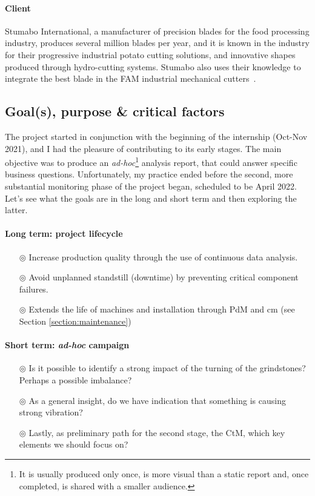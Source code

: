 \paragraph{Client} Stumabo International, a manufacturer of precision blades for the food processing industry, produces several million blades per year, 
and it is known in the industry for their progressive industrial potato cutting solutions, and innovative shapes produced through hydro-cutting systems.
Stumabo also uses their knowledge to integrate the best blade in the FAM industrial mechanical cutters~\cite{Misc:stumabo_en_website}.

\subsection{Goal(s), purpose \& critical factors}
The project started in conjunction with the beginning of the internship (Oct-Nov 2021), and I had the pleasure of contributing to its early stages.
The main objective was to produce an \textit{ad-hoc}\footnote{It is usually produced only once, is more visual than a static report and, once completed, is shared with a smaller audience.} 
analysis report, that could answer specific business questions.
Unfortunately, my practice ended before the second, more substantial monitoring phase of the project began, scheduled to be April 2022.
Let's see what the goals are in the long and short term and then exploring the latter.
\paragraph{Long term: project lifecycle}
\begin{itemize}
    \item[$\circledcirc$] Increase production quality through the use of continuous data analysis.
    \item[$\circledcirc$] Avoid unplanned standstill (downtime) by preventing critical component failures.
    \item[$\circledcirc$] Extends the life of machines and installation through \acl{PdM} and \acl{cm} (see Section \ref{section:maintenance})
\end{itemize}
\paragraph{Short term: \textit{ad-hoc} campaign}
\begin{itemize}
    \item[$\circledcirc$] Is  it possible to identify a strong impact of the turning of the grindstones? Perhaps a possible imbalance?
    \item[$\circledcirc$] As a general insight, do we have indication that something is causing strong vibration?
    \item[$\circledcirc$] Lastly, as preliminary path for the second stage, the \ac{CtM}, which key elements we should focus on? 
\end{itemize}

